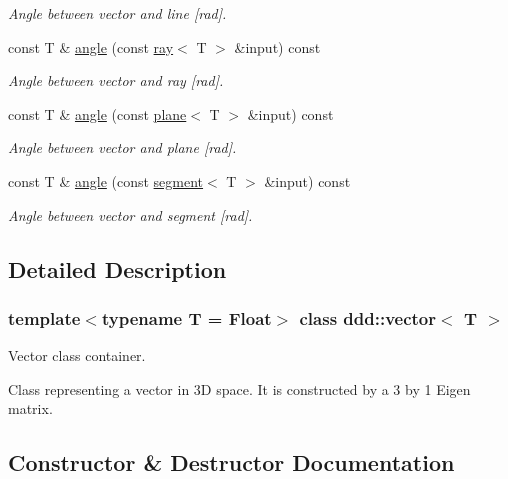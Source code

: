 \begin{DoxyCompactItemize}
\begin{DoxyCompactList}\small\item\em Angle between vector and line \mbox{[}rad\mbox{]}. \end{DoxyCompactList}\item 
const T \& \hyperlink{classddd_1_1vector_a893bfd1b0209a0a7e7630a3ddf38193d}{angle} (const \hyperlink{classddd_1_1ray}{ray}$<$ T $>$ \&input) const
\begin{DoxyCompactList}\small\item\em Angle between vector and ray \mbox{[}rad\mbox{]}. \end{DoxyCompactList}\item 
const T \& \hyperlink{classddd_1_1vector_a6e6f7e86378329051b53b969bdb607ae}{angle} (const \hyperlink{classddd_1_1plane}{plane}$<$ T $>$ \&input) const
\begin{DoxyCompactList}\small\item\em Angle between vector and plane \mbox{[}rad\mbox{]}. \end{DoxyCompactList}\item 
const T \& \hyperlink{classddd_1_1vector_aa1d50d563f55d5795d565ed70ec5b845}{angle} (const \hyperlink{classddd_1_1segment}{segment}$<$ T $>$ \&input) const
\begin{DoxyCompactList}\small\item\em Angle between vector and segment \mbox{[}rad\mbox{]}. \end{DoxyCompactList}\end{DoxyCompactItemize}


\subsection{Detailed Description}
\subsubsection*{template$<$typename T = Float$>$\newline
class ddd\+::vector$<$ T $>$}

Vector class container. 

Class representing a vector in 3D space. It is constructed by a 3 by 1 Eigen matrix. 

\subsection{Constructor \& Destructor Documentation}
\mbox{\label{classddd_1_1vector_a5dec8f05a011372b6b2795827607e6b2}} 
